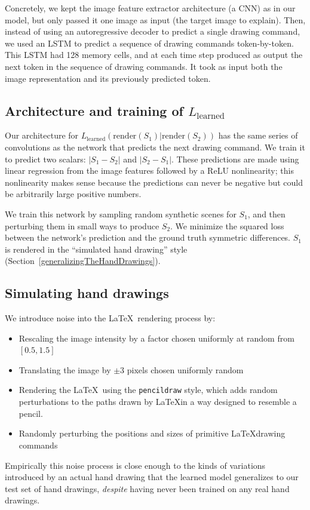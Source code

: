 \documentclass{article}
\theoremstyle{definition}
\begin{document}
Concretely, we kept the image feature extractor architecture (a CNN) as in our model,
but only passed it one image as input (the target image to explain).
Then, instead of using an autoregressive decoder to predict a single drawing command,
we used an LSTM to predict a sequence of drawing commands token-by-token.
This LSTM had 128 memory cells,
and at each time step produced as output the next token in the sequence of drawing commands.
It took as input both the image representation and its previously predicted token.


\subsection{Architecture and training of $L_{\text{learned}}$}\label{distanceAppendix}
Our architecture for
$L_{\text{learned}}(\text{render}(S_1)|\text{render}(S_2))$ has the
same series of convolutions as the network that predicts the next
drawing command. We train it to predict two scalars: $|S_1 - S_2|$ and
$|S_2 - S_1|$.  These predictions are made using linear regression
from the image features followed by a ReLU nonlinearity; this
nonlinearity makes sense because the predictions can never be negative
but could be arbitrarily large positive numbers.

We train this network by sampling random synthetic scenes for $S_1$,
and then perturbing them in small ways to produce $S_2$.
We minimize the squared loss between the network's prediction and the ground truth symmetric differences.
$S_1$ is rendered in the ``simulated hand drawing'' style (Section~\ref{generalizingTheHandDrawings}).


\subsection{Simulating hand drawings}\label{noisyAppendix}
We introduce noise into the \LaTeX~rendering process by:
\begin{itemize}
\item Rescaling the image intensity by a factor chosen uniformly at random from $[0.5,1.5]$
\item Translating the image by $\pm 3$ pixels chosen uniformly random
\item Rendering the \LaTeX~using the \verb|pencildraw| style,
  which adds random perturbations to the paths drawn by \LaTeX in a way designed to resemble a pencil.
\item Randomly perturbing the positions and sizes of primitive  \LaTeX drawing commands
\end{itemize}
Empirically this noise process is close enough to the kinds of variations introduced by
an actual hand drawing that
the learned model generalizes to
our test set of hand drawings,
\emph{despite} having never been trained on any real hand drawings.
\end{document}
